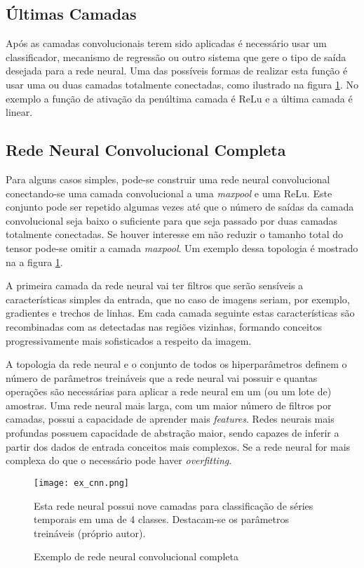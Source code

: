 \subsection{Últimas Camadas}
Após as camadas convolucionais terem sido aplicadas é necessário usar um
classificador, mecanismo de regressão ou outro sistema que gere o tipo de saída
desejada para a rede neural. Uma das possíveis formas de realizar esta função é
usar uma ou duas camadas totalmente conectadas, como ilustrado na figura
\ref{fig:ex_cnn}. No exemplo a função de ativação da penúltima camada é
ReLu e a última camada é linear.

\subsection{Rede Neural Convolucional Completa}
Para alguns casos simples, pode-se construir uma rede neural convolucional
conectando-se uma camada convolucional a uma \emph{maxpool} e uma ReLu. Este
conjunto pode ser repetido algumas vezes até que o número de saídas da camada
convolucional seja baixo o suficiente para que seja passado por duas camadas
totalmente conectadas. Se houver interesse em não reduzir o tamanho total do
tensor pode-se omitir a camada \emph{maxpool}. Um exemplo dessa topologia é
mostrado na a figura \ref{fig:ex_cnn}.

A primeira camada da rede neural vai ter filtros que serão sensíveis a
características simples da entrada, que no caso de imagens seriam, por exemplo,
gradientes e trechos de linhas. Em
cada camada seguinte estas características são recombinadas com as detectadas
nas regiões vizinhas, formando conceitos progressivamente mais sofisticados a
respeito da imagem.

A topologia da rede neural e o conjunto de todos os hiperparâmetros definem o
número de parâmetros treináveis que a rede neural vai possuir e quantas
operações são necessárias para aplicar a rede neural em um (ou um lote de)
amostras. Uma rede neural mais larga, com um maior número de filtros por
camadas, possui a capacidade de aprender mais \emph{features}. Redes neurais
mais profundas possuem capacidade de abstração maior, sendo capazes de inferir
a partir dos dados de entrada conceitos mais complexos. Se a rede neural for
mais complexa do que o necessário pode haver \emph{overfitting}.

\begin{figure}[!htb]
	\centering
	\texttt{[image: ex\_cnn.png]}
	\caption{Exemplo de rede neural convolucional completa}
	\label{fig:ex_cnn}
	Esta rede neural possui nove camadas para
	classificação de séries temporais em uma de 4 classes. Destacam-se os
	parâmetros treináveis (próprio autor).
\end{figure}

